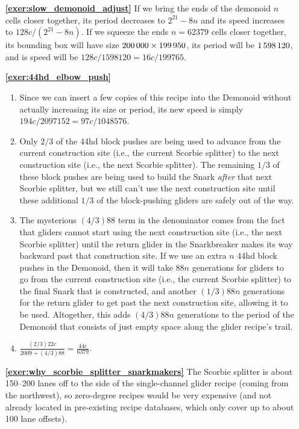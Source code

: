 \begin{multicols}{2}
\begin{itemize}[leftmargin=0em]
		\item[\bf\color{ocre}\sffamily\ref{exer:slow_demonoid_adjust}] If we bring the ends of the demonoid $n$ cells closer together, its period decreases to $2^{21} - 8n$ and its speed increases to $128c/(2^{21} - 8n)$. If we squeeze the ends $n = 62379$ cells closer together, its bounding box will have size $200{\,}000 \times 199{\,}950$, its period will be $1{\,}598{\,}120$, and is speed will be $128c/1598120 = 16c/199765$.\\
		
		\item[\bf\color{ocre}\sffamily\ref{exer:44hd_elbow_push}] \begin{enumerate}[leftmargin=1.5em,label=\bf\color{ocre}(\alph*)]
			\item Since we can insert a few copies of this recipe into the Demonoid without actually increasing its size or period, its new speed is simply $194c/2097152 = 97c/1048576$.
			
			\item Only $2/3$ of the 44hd block pushes are being used to advance from the current construction site (i.e., the current Scorbie splitter) to the next construction site (i.e., the next Scorbie splitter). The remaining $1/3$ of these block pushes are being used to build the Snark \emph{after} that next Scorbie splitter, but we still can't use the next construction site until these additional $1/3$ of the block-pushing gliders are safely out of the way.
			
			\item The mysterious $(4/3)88$ term in the denominator comes from the fact that gliders cannot start using the next construction site (i.e., the next Scorbie splitter) until the return glider in the Snarkbreaker makes its way backward past that construction site. If we use an extra $n$ 44hd block pushes in the Demonoid, then it will take $88n$ generations for gliders to go from the current construction site (i.e., the current Scorbie splitter) to the final Snark that is constructed, and another $(1/3)88n$ generations for the return glider to get past the next construction site, allowing it to be used. Altogether, this adds $(4/3)88n$ generations to the period of the Demonoid that consists of just empty space along the glider recipe's trail.
			
			\item $\frac{(2/3)22c}{2009 + (4/3)88} = \frac{44c}{6379}$.\\
		\end{enumerate}
		
		\item[\bf\color{ocre}\sffamily\ref{exer:why_scorbie_splitter_snarkmakers}] The Scorbie splitter is about 150--200 lanes off to the side of the single-channel glider recipe (coming from the northwest), so zero-degree recipes would be very expensive (and not already located in pre-existing recipe databases, which only cover up to about 100 lane offsets).\\
	\end{itemize}
\end{multicols}




